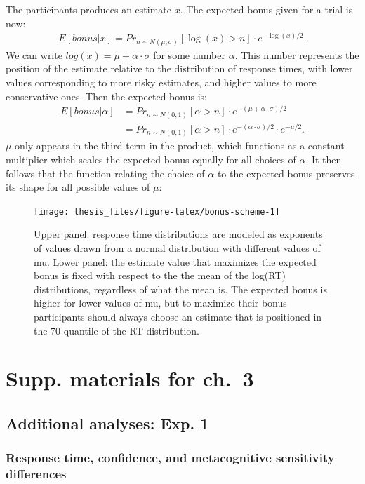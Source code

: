 \documentclass[12pt,twoside]{reedthesis}
\begin{document}
The participants produces an estimate \(x\). The expected bonus given for a trial is now:
\begin{align}
    E[bonus|x]=Pr_{n \sim N(\mu, \sigma)}[\log(x)>n] \cdot e^{-\log(x)/2}.
\end{align}
We can write \(log(x)=\mu+\alpha \cdot \sigma\) for some number \(\alpha\). This number represents the position of the estimate relative to the distribution of response times, with lower values corresponding to more risky estimates, and higher values to more conservative ones. Then the expected bonus is:
\begin{align}
    E[bonus|\alpha]&=Pr_{n \sim N(0, 1)}[\alpha>n] \cdot e^{-(\mu+\alpha \cdot \sigma)/2} \\ \nonumber
    &= Pr_{n \sim N(0, 1)}[\alpha>n] \cdot e^{-(\alpha \cdot \sigma)/2} \cdot e^{-\mu/2}. 
\end{align}
\(\mu\) only appears in the third term in the product, which functions as a constant multiplier which scales the expected bonus equally for all choices of \(\alpha\). It then follows that the function relating the choice of \(\alpha\) to the expected bonus preserves its shape for all possible values of \(\mu\):
\begin{figure}
\texttt{[image: thesis\_files/figure-latex/bonus-scheme-1]} \caption[bonus structure]{Upper panel: response time distributions are modeled as exponents of values drawn from a normal distribution with different values of mu. Lower panel: the estimate value that maximizes the expected bonus is fixed with respect to the the mean of the log(RT) distributions, regardless of what the mean is. The expected bonus is higher for lower values of mu, but to maximize their bonus participants should always choose an estimate that is positioned in the 70 quantile of the RT distribution.}\label{fig:bonus-scheme}
\end{figure}
\hypertarget{appRC:everything}{%
\chapter{Supp. materials for ch.~3}\label{appRC:everything}}

\hypertarget{additional-analyses-exp.-1}{%
\section{Additional analyses: Exp. 1}\label{additional-analyses-exp.-1}}

\hypertarget{appRC:asymmetries1}{%
\subsection{Response time, confidence, and metacognitive sensitivity differences}\label{appRC:asymmetries1}}
\end{document}
